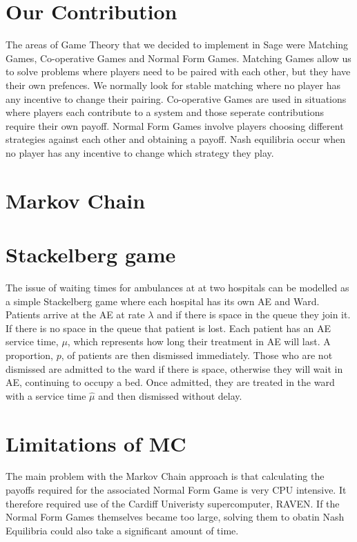 \documentclass[a0,landscape]{a0poster}
\begin{document}
\begin{multicols}{2}
\section*{Our Contribution}
The areas of Game Theory that we decided to implement in Sage were Matching Games, Co-operative Games and Normal Form Games.
Matching Games allow us to solve problems where players need to be paired with each other, but they have their own prefences.
We normally look for stable matching where no player has any incentive to change their pairing.
Co-operative Games are used in situations where players each contribute to a system and those seperate contributions require their own payoff.
Normal Form Games involve players choosing different strategies against each other and obtaining a payoff.
Nash equilibria occur when no player has any incentive to change which strategy they play.


\color{Goldenrod}
\section*{Markov Chain}


\section*{Stackelberg game}
The issue of waiting times for ambulances at at two hospitals can be modelled as a simple Stackelberg game where each hospital has its own AE and Ward.
Patients arrive at the AE at rate $\lambda$ and if there is space in the queue they join it.
If there is no space in the queue that patient is lost.
Each patient has an AE service time, $\mu$, which represents how long their treatment in AE will last.
A proportion, $p$, of patients are then dismissed immediately.
Those who are not dismissed are admitted to the ward if there is space, otherwise they will wait in AE, continuing to occupy a bed.
Once admitted, they are treated in the ward with a service time $\hat{\mu}$ and then dismissed without delay.


\color{Olive}
\section*{Limitations of MC}
The main problem with the Markov Chain approach is that calculating the payoffs required for the associated Normal Form Game is very CPU intensive.
It therefore required use of the Cardiff Univeristy supercomputer, RAVEN.
If the Normal Form Games themselves became too large, solving them to obatin Nash Equilibria could also take a significant amount of time.



\end{multicols}
\end{document}

